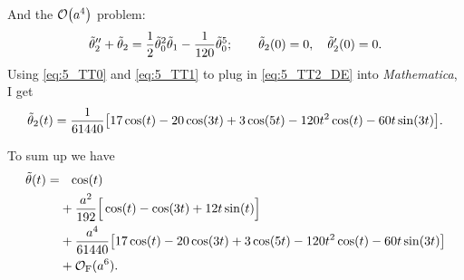 \documentclass[11pt,letter, swedish, english
]{article}
\begin{document}
And the  $\order{a^4}$ problem:
\begin{equation}\label{eq:5_TT2_DE}
\TT_2''+\TT_2=\frac{1}{2}\TT_0^2\TT_1-\frac{1}{120}\TT_0^5;
\qquad \TT_2(0)=0\qcomma \TT_2'(0)=0.
\end{equation}
Using \eqref{eq:5_TT0} and \eqref{eq:5_TT1} to plug in
\eqref{eq:5_TT2_DE} into \textit{Mathematica}, I get
\begin{equation}
\tilde{\theta}_2(t)=\frac{1}{61440}
\qty[
17\cos(t)-20\cos(3t)+3\cos(5t)-120t^2\cos(t)-60t\sin(3t)
].
\end{equation}

To sum up we have
\begin{equation}\label{eq:5_TT}
\begin{aligned}
\tilde{\theta}(t)=&\phantom{+}\cos(t)\\
&+\frac{a^2}{192}\Big[\cos(t) - \cos(3t) + 12t\sin(t)\Big]\\
&+\frac{a^4}{61440}
\qty[
17\cos(t)-20\cos(3t)+3\cos(5t)-120t^2\cos(t)-60t\sin(3t)
]\\ &+ \mathcal{O}_\text{F}(a^6).
\end{aligned}
\end{equation}
\end{document}
